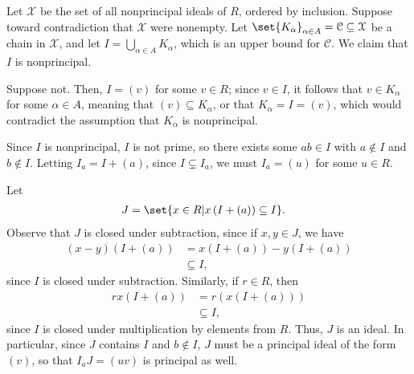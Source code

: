 \documentclass[10pt]{mypackage}
\begin{document}
\begin{solution}
  Let $ \mathcal{X} $ be the set of all nonprincipal ideals of $R$, ordered by inclusion. Suppose toward contradiction that $ \mathcal{X} $ were nonempty. Let $ \set{K_{\alpha}}_{\alpha\in A} = \mathcal{C}\subseteq \mathcal{X} $ be a chain in $ \mathcal{X} $, and let $I = \bigcup_{\alpha\in A}K_{\alpha}$, which is an upper bound for $ \mathcal{C} $. We claim that $I$ is nonprincipal.\newline

  Suppose not. Then, $I = \left( v \right)$ for some $v\in R$; since $v\in I$, it follows that $v\in K_{\alpha}$ for some $\alpha\in A$, meaning that $ \left( v \right)\subseteq K_{\alpha} $, or that $ K_{\alpha} = I = \left( v \right) $, which would contradict the assumption that $K_{\alpha}$ is nonprincipal.\newline

  Since $I$ is nonprincipal, $I$ is not prime, so there exists some $ab\in I$ with $a\notin I$ and $b\notin I$. Letting $I_a = I + \left( a \right)$, since $ I\subsetneq I_a $, we must $I_a = \left( u \right)$ for some $u\in R$.\newline

  Let
  \begin{align*}
    J &= \set{x\in R | x\left( I + \left( a \right) \right)\subseteq I}.
  \end{align*}
  Observe that $J$ is closed under subtraction, since if $x,y\in J$, we have
  \begin{align*}
    \left( x-y \right)\left( I + \left( a \right) \right) &= x\left( I + \left( a \right) \right) - y\left( I + \left( a \right) \right)\\
                                                          &\subseteq I,
  \end{align*}
  since $I$ is closed under subtraction. Similarly, if $r\in R$, then
  \begin{align*}
    rx\left( I + \left( a \right) \right) &= r\left( x \left( I + \left( a \right) \right) \right)\\
                                          &\subseteq I,
  \end{align*}
  since $I$ is closed under multiplication by elements from $R$. Thus, $J$ is an ideal. In particular, since $J$ contains $I$ and $b\notin I$, $J$ must be a principal ideal of the form $\left( v \right)$, so that $I_aJ = \left( uv \right)$ is principal as well.\newline


\end{solution}
\end{document}
